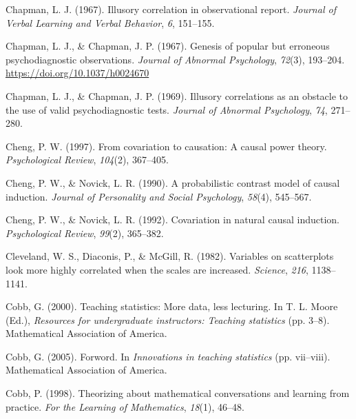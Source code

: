 \documentclass[11pt]{umnthesis}
\newlength{\cslhangindent}
\newenvironment{CSLReferences}[2] %
 {%
  \setlength{\parindent}{0pt}
  \ifodd #1 \everypar{\setlength{\hangindent}{\cslhangindent}}\ignorespaces\fi
  \ifnum #2 > 0
  \setlength{\parskip}{#2\baselineskip}
  \fi
 }%
 {}
\begin{document}
\begin{CSLReferences}{1}{0}
\leavevmode{}%
Chapman, L. J. (1967). Illusory correlation in observational report. \emph{Journal of Verbal Learning and Verbal Behavior}, \emph{6}, 151--155.

\leavevmode{}%
Chapman, L. J., \& Chapman, J. P. (1967). Genesis of popular but erroneous psychodiagnostic observations. \emph{Journal of Abnormal Psychology}, \emph{72}(3), 193--204. \url{https://doi.org/10.1037/h0024670}

\leavevmode{}%
Chapman, L. J., \& Chapman, J. P. (1969). Illusory correlations as an obstacle to the use of valid psychodiagnostic tests. \emph{Journal of Abnormal Psychology}, \emph{74}, 271--280.

\leavevmode{}%
Cheng, P. W. (1997). From covariation to causation: A causal power theory. \emph{Psychological Review}, \emph{104}(2), 367--405.

\leavevmode{}%
Cheng, P. W., \& Novick, L. R. (1990). A probabilistic contrast model of causal induction. \emph{Journal of Personality and Social Psychology}, \emph{58}(4), 545--567.

\leavevmode{}%
Cheng, P. W., \& Novick, L. R. (1992). Covariation in natural causal induction. \emph{Psychological Review}, \emph{99}(2), 365--382.

\leavevmode{}%
Cleveland, W. S., Diaconis, P., \& McGill, R. (1982). Variables on scatterplots look more highly correlated when the scales are increased. \emph{Science}, \emph{216}, 1138--1141.

\leavevmode{}%
Cobb, G. (2000). Teaching statistics: More data, less lecturing. In T. L. Moore (Ed.), \emph{Resources for undergraduate instructors: Teaching statistics} (pp. 3--8). Mathematical Association of America.

\leavevmode{}%
Cobb, G. (2005). Forword. In \emph{Innovations in teaching statistics} (pp. vii--viii). Mathematical Association of America.

\leavevmode{}%
Cobb, P. (1998). Theorizing about mathematical conversations and learning from practice. \emph{For the Learning of Mathematics}, \emph{18}(1), 46--48.


\end{CSLReferences}
\end{document}
